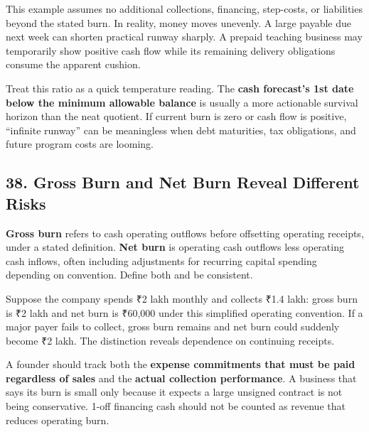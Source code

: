 This example assumes no additional collections, financing, step-costs, or liabilities beyond the stated burn. In reality, money moves unevenly. A large payable due next week can shorten practical runway sharply. A prepaid teaching business may temporarily show positive cash flow while its remaining delivery obligations consume the apparent cushion.

Treat this ratio as a quick temperature reading. The \textbf{cash forecast's 1st date below the minimum allowable balance} is usually a more actionable survival horizon than the neat quotient. If current burn is zero or cash flow is positive, ``infinite runway'' can be meaningless when debt maturities, tax obligations, and future program costs are looming.

\subsection*{38. Gross Burn and Net Burn Reveal Different Risks}

\textbf{Gross burn} refers to cash operating outflows before offsetting operating receipts, under a stated definition. \textbf{Net burn} is operating cash outflows less operating cash inflows, often including adjustments for recurring capital spending depending on convention. Define both and be consistent.

Suppose the company spends ₹2 lakh monthly and collects ₹1.4 lakh: gross burn is ₹2 lakh and net burn is ₹60,000 under this simplified operating convention. If a major payer fails to collect, gross burn remains and net burn could suddenly become ₹2 lakh. The distinction reveals dependence on continuing receipts.

A founder should track both the \textbf{expense commitments that must be paid regardless of sales} and the \textbf{actual collection performance}. A business that says its burn is small only because it expects a large unsigned contract is not being conservative. 1-off financing cash should not be counted as revenue that reduces operating burn.
